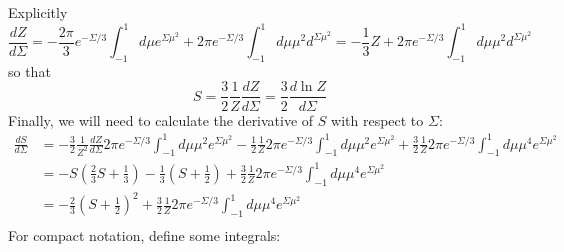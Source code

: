 \documentclass[reqno]{article}
\begin{document}
    Explicitly
    \begin{equation}
        \frac{dZ}{d\Sigma}
        =
        -\frac{2 \pi}{3} e^{-\Sigma/3} \int_{-1}^1 d\mu e^{\Sigma \mu^2}
        + 2\pi e^{-\Sigma/3} \int_{-1}^1 d\mu \mu^2 d^{\Sigma \mu^2}
        =
        -\frac13 Z 
        + 2 \pi e^{-\Sigma / 3}\int_{-1}^1 d\mu \mu^2 d^{\Sigma \mu^2}
    \end{equation}
    so that
    \begin{equation}
        S
        =
        \frac32 \frac{1}{Z} \frac{d Z}{d \Sigma}
        =
        \frac32 \frac{d \ln Z}{d \Sigma}
    \end{equation}
    Finally, we will need to calculate the derivative of $S$ with respect to $\Sigma$:
    \begin{equation}
    \begin{split}
        \frac{dS}{d \Sigma}
        &=
        -\frac32 \frac{1}{Z^2} \frac{dZ}{d\Sigma} 2 \pi e^{-\Sigma / 3} \int_{-1}^1 d\mu \mu^2 e^{\Sigma \mu^2}
        -\frac12 \frac{1}{Z} 2\pi e^{-\Sigma/3} \int_{-1}^1 d\mu \mu^2 e^{\Sigma \mu^2}
        + \frac32 \frac{1}{Z} 2\pi e^{-\Sigma/3} \int_{-1}^1 d\mu \mu^4 e^{\Sigma \mu^2} \\
        &=
        -S \left( \frac23 S + \frac13 \right)
        - \frac13 \left( S + \frac12 \right)
        + \frac32 \frac{1}{Z} 2\pi e^{-\Sigma/3} \int_{-1}^1 d\mu \mu^4 e^{\Sigma \mu^2} \\
        &=
        -\frac23 \left( S + \frac12 \right)^2
        + \frac32 \frac{1}{Z} 2\pi e^{-\Sigma/3} \int_{-1}^1 d\mu \mu^4 e^{\Sigma \mu^2} \\
    \end{split}
    \end{equation}
    For compact notation, define some integrals:
\end{document}
